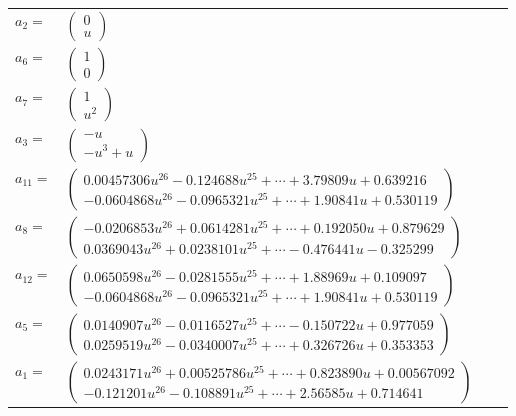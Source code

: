 \documentclass[1p]{elsarticle_modified}
\theoremstyle{definition}
\begin{document}
\begin{tabular}{m{7pt} m{180pt} m{7pt} m{180pt} }
\flushright $a_{2}=$&$\begin{pmatrix}0\\u\end{pmatrix}$ \\
\flushright $a_{6}=$&$\begin{pmatrix}1\\0\end{pmatrix}$ \\
\flushright $a_{7}=$&$\begin{pmatrix}1\\u^2\end{pmatrix}$ \\
\flushright $a_{3}=$&$\begin{pmatrix}- u\\- u^3+u\end{pmatrix}$ \\
\flushright $a_{11}=$&$\begin{pmatrix}0.00457306 u^{26}-0.124688 u^{25}+\cdots+3.79809 u+0.639216\\-0.0604868 u^{26}-0.0965321 u^{25}+\cdots+1.90841 u+0.530119\end{pmatrix}$ \\
\flushright $a_{8}=$&$\begin{pmatrix}-0.0206853 u^{26}+0.0614281 u^{25}+\cdots+0.192050 u+0.879629\\0.0369043 u^{26}+0.0238101 u^{25}+\cdots-0.476441 u-0.325299\end{pmatrix}$ \\
\flushright $a_{12}=$&$\begin{pmatrix}0.0650598 u^{26}-0.0281555 u^{25}+\cdots+1.88969 u+0.109097\\-0.0604868 u^{26}-0.0965321 u^{25}+\cdots+1.90841 u+0.530119\end{pmatrix}$ \\
\flushright $a_{5}=$&$\begin{pmatrix}0.0140907 u^{26}-0.0116527 u^{25}+\cdots-0.150722 u+0.977059\\0.0259519 u^{26}-0.0340007 u^{25}+\cdots+0.326726 u+0.353353\end{pmatrix}$ \\
\flushright $a_{1}=$&$\begin{pmatrix}0.0243171 u^{26}+0.00525786 u^{25}+\cdots+0.823890 u+0.00567092\\-0.121201 u^{26}-0.108891 u^{25}+\cdots+2.56585 u+0.714641\end{pmatrix}$ \\

\end{tabular}
\end{document}
